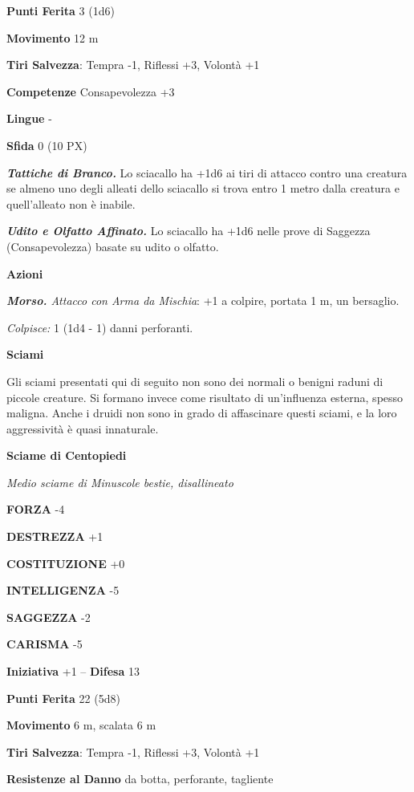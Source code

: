 \begin{multicols}{2}
	\textbf{Punti Ferita} 3 (1d6)

	\textbf{Movimento} 12 m

	\textbf{Tiri Salvezza}: Tempra -1, Riflessi +3, Volontà +1

	\textbf{Competenze} Consapevolezza +3

	\textbf{Lingue} -

	\textbf{Sfida} 0 (10 PX)

	\textit{\textbf{Tattiche di Branco.}} Lo sciacallo ha +1d6 ai tiri di attacco contro una creatura se almeno uno degli alleati dello sciacallo si trova entro 1 metro dalla creatura e quell'alleato non è inabile.

	\textit{\textbf{Udito e Olfatto Affinato.}} Lo sciacallo ha +1d6 nelle prove di Saggezza (Consapevolezza) basate su udito o olfatto.

	\textbf{Azioni}

	\textit{\textbf{Morso.} Attacco con Arma da Mischia}: +1 a colpire, portata 1 m, un bersaglio.

	\textit{Colpisce:} 1 (1d4 - 1) danni perforanti.

	\medskip\textbf{Sciami}

	Gli sciami presentati qui di seguito non sono dei normali o benigni raduni di piccole creature. Si formano invece come risultato di un'influenza esterna, spesso maligna. Anche i druidi non sono in grado di affascinare questi sciami, e la loro aggressività è quasi innaturale.

	\textbf{Sciame di Centopiedi}

	\textit{Medio sciame di Minuscole bestie, disallineato}

	\textbf{FORZA} -4

	\textbf{DESTREZZA} +1

	\textbf{COSTITUZIONE} +0

	\textbf{INTELLIGENZA} -5

	\textbf{SAGGEZZA} -2

	\textbf{CARISMA} -5

	\textbf{Iniziativa} +1 -- \textbf{Difesa} 13

	\textbf{Punti Ferita} 22 (5d8)

	\textbf{Movimento} 6 m, scalata 6 m

	\textbf{Tiri Salvezza}: Tempra -1, Riflessi +3, Volontà +1

	\textbf{Resistenze al Danno} da botta, perforante, tagliente


\end{multicols}
